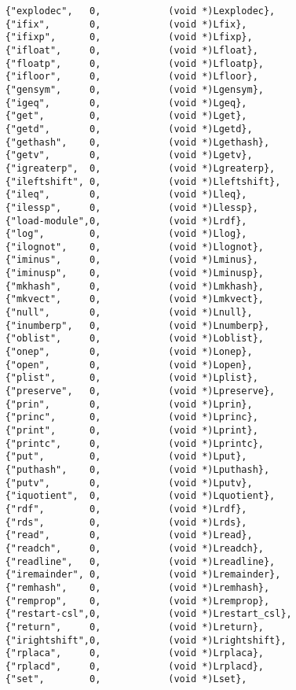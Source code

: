 {\begin{verbatim}
    {"explodec",   0,            (void *)Lexplodec},
    {"ifix",       0,            (void *)Lfix},
    {"ifixp",      0,            (void *)Lfixp},
    {"ifloat",     0,            (void *)Lfloat},
    {"floatp",     0,            (void *)Lfloatp},
    {"ifloor",     0,            (void *)Lfloor},
    {"gensym",     0,            (void *)Lgensym},
    {"igeq",       0,            (void *)Lgeq},
    {"get",        0,            (void *)Lget},
    {"getd",       0,            (void *)Lgetd},
    {"gethash",    0,            (void *)Lgethash},
    {"getv",       0,            (void *)Lgetv},
    {"igreaterp",  0,            (void *)Lgreaterp},
    {"ileftshift", 0,            (void *)Lleftshift},
    {"ileq",       0,            (void *)Lleq},
    {"ilessp",     0,            (void *)Llessp},
    {"load-module",0,            (void *)Lrdf},
    {"log",        0,            (void *)Llog},
    {"ilognot",    0,            (void *)Llognot},
    {"iminus",     0,            (void *)Lminus},
    {"iminusp",    0,            (void *)Lminusp},
    {"mkhash",     0,            (void *)Lmkhash},
    {"mkvect",     0,            (void *)Lmkvect},
    {"null",       0,            (void *)Lnull},
    {"inumberp",   0,            (void *)Lnumberp},
    {"oblist",     0,            (void *)Loblist},
    {"onep",       0,            (void *)Lonep},
    {"open",       0,            (void *)Lopen},
    {"plist",      0,            (void *)Lplist},
    {"preserve",   0,            (void *)Lpreserve},
    {"prin",       0,            (void *)Lprin},
    {"princ",      0,            (void *)Lprinc},
    {"print",      0,            (void *)Lprint},
    {"printc",     0,            (void *)Lprintc},
    {"put",        0,            (void *)Lput},
    {"puthash",    0,            (void *)Lputhash},
    {"putv",       0,            (void *)Lputv},
    {"iquotient",  0,            (void *)Lquotient},
    {"rdf",        0,            (void *)Lrdf},
    {"rds",        0,            (void *)Lrds},
    {"read",       0,            (void *)Lread},
    {"readch",     0,            (void *)Lreadch},
    {"readline",   0,            (void *)Lreadline},
    {"iremainder", 0,            (void *)Lremainder},
    {"remhash",    0,            (void *)Lremhash},
    {"remprop",    0,            (void *)Lremprop},
    {"restart-csl",0,            (void *)Lrestart_csl},
    {"return",     0,            (void *)Lreturn},
    {"irightshift",0,            (void *)Lrightshift},
    {"rplaca",     0,            (void *)Lrplaca},
    {"rplacd",     0,            (void *)Lrplacd},
    {"set",        0,            (void *)Lset},

\end{verbatim}}
